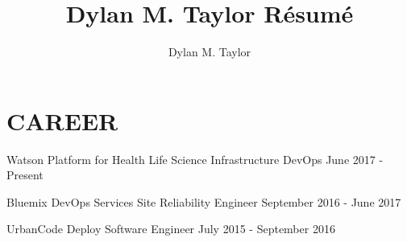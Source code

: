 \documentclass[]{dylan-resume}
\author{Dylan M. Taylor}
\title{Dylan M. Taylor Résumé}
\begin{document}
\lastupdated




\hfill
\begin{minipage}[t]{1.00\textwidth}


\section{CAREER}
\hspace*{\fill}
\vspace{\topsep} %
\begin{tightemize}
\item Watson Platform for Health Life Science Infrastructure DevOps \hspace*{\fill}June 2017 - Present
\item Bluemix DevOps Services Site Reliability Engineer \hspace*{\fill}September 2016 - June 2017
\item UrbanCode Deploy Software Engineer \hspace*{\fill}July 2015 - September 2016
\end{tightemize}
\sectionsep



\end{minipage}
\end{document}
